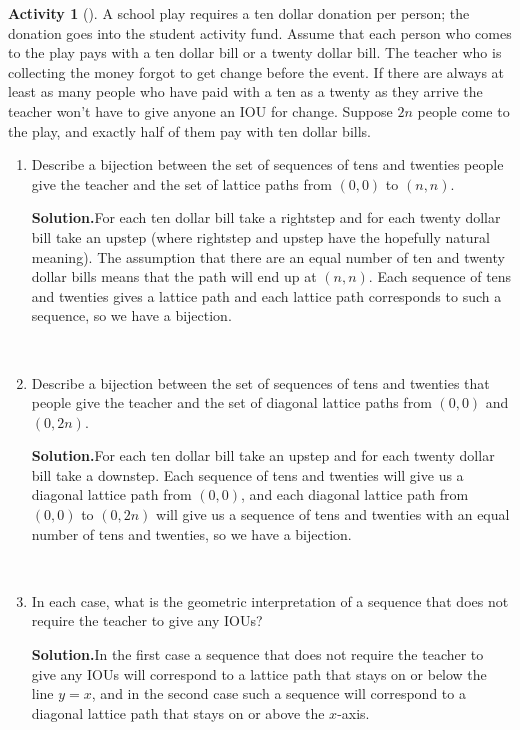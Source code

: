 \documentclass[10pt,]{book}
\theoremstyle{plain}
\theoremstyle{definition}
\newtheorem{activity}[project]{Activity}
\numberwithin{equation}{chapter}
\begin{document}
\begin{activity}[]\label{activity-4}
A school play requires a ten dollar donation per person; the donation goes into the student activity fund. Assume that each person who comes to the play pays with a ten dollar bill or a twenty dollar bill. The teacher who is collecting the money forgot to get change before the event. If there are always at least as many people who have paid with a ten as a twenty as they arrive the teacher won't have to give anyone an IOU for change. Suppose \(2n\) people come to the play, and exactly half of them pay with ten dollar bills.%
~\par
\begin{enumerate}[label=(\alph*)]
 \item Describe a bijection between the set of sequences of tens and twenties people give the teacher and the set of lattice paths from \((0,0)\) to \((n,n)\).%
\par\medskip\noindent%
\textbf{Solution.}\quad For each ten dollar bill take a rightstep and for each twenty dollar bill take an upstep (where rightstep and upstep have the hopefully natural meaning). The assumption that there are an equal number of ten and twenty dollar bills means that the path will end up at \((n,n)\). Each sequence of tens and twenties gives a lattice path and each lattice path corresponds to such a sequence, so we have a bijection.%

~\par
\item Describe a bijection between the set of sequences of tens and twenties that people give the teacher and the set of diagonal lattice paths from \((0,0)\) and \((0,2n)\).%
\par\medskip\noindent%
\textbf{Solution.}\quad For each ten dollar bill take an upstep and for each twenty dollar bill take a downstep. Each sequence of tens and twenties will give us a diagonal lattice path from \((0,0)\), and each diagonal lattice path from\((0,0)\) to \((0,2n)\) will give us a sequence of tens and twenties with an equal number of tens and twenties, so we have a bijection.%

~\par
\item In each case, what is the geometric interpretation of a sequence that does not require the teacher to give any IOUs?%
\par\medskip\noindent%
\textbf{Solution.}\quad In the first case a sequence that does not require the teacher to give any IOUs will correspond to a lattice path that stays on or below the line \(y=x\), and in the second case such a sequence will correspond to a diagonal lattice path that stays on or above the \(x\)-axis.%

\end{enumerate}
\end{activity}
\end{document}
